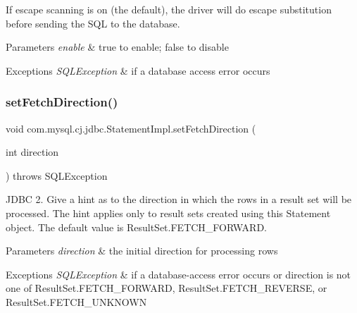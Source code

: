 If escape scanning is on (the default), the driver will do escape substitution before sending the S\+QL to the database.


\begin{DoxyParams}{Parameters}
{\em enable} & true to enable; false to disable\\
\hline
\end{DoxyParams}

\begin{DoxyExceptions}{Exceptions}
{\em S\+Q\+L\+Exception} & if a database access error occurs \\
\hline
\end{DoxyExceptions}
\mbox{\label{classcom_1_1mysql_1_1cj_1_1jdbc_1_1_statement_impl_a5f61e150957f4bdfa9682061008d448f}} 
\subsubsection{\texorpdfstring{set\+Fetch\+Direction()}{setFetchDirection()}}
{\footnotesize\ttfamily void com.\+mysql.\+cj.\+jdbc.\+Statement\+Impl.\+set\+Fetch\+Direction (\begin{DoxyParamCaption}\item[{int}]{direction }\end{DoxyParamCaption}) throws S\+Q\+L\+Exception}

J\+D\+BC 2. Give a hint as to the direction in which the rows in a result set will be processed. The hint applies only to result sets created using this Statement object. The default value is Result\+Set.\+F\+E\+T\+C\+H\+\_\+\+F\+O\+R\+W\+A\+RD.


\begin{DoxyParams}{Parameters}
{\em direction} & the initial direction for processing rows\\
\hline
\end{DoxyParams}

\begin{DoxyExceptions}{Exceptions}
{\em S\+Q\+L\+Exception} & if a database-\/access error occurs or direction is not one of Result\+Set.\+F\+E\+T\+C\+H\+\_\+\+F\+O\+R\+W\+A\+RD, Result\+Set.\+F\+E\+T\+C\+H\+\_\+\+R\+E\+V\+E\+R\+SE, or Result\+Set.\+F\+E\+T\+C\+H\+\_\+\+U\+N\+K\+N\+O\+WN \\
\hline
\end{DoxyExceptions}
\mbox{\label{classcom_1_1mysql_1_1cj_1_1jdbc_1_1_statement_impl_ad68efa27b29ed10cdc35f711dad0d16f}} 
